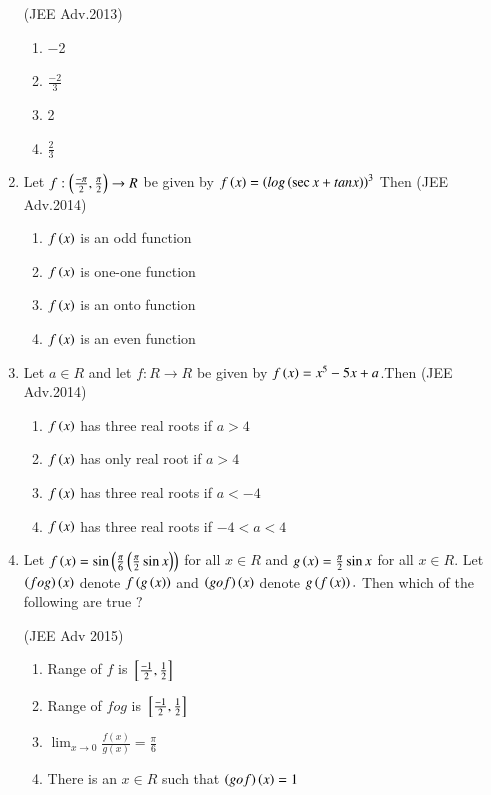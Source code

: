 \documentclass[journal,12pt,twocolumn]{IEEEtran}
\theoremstyle{remark}
\begin{document}
\begin{enumerate}[start=2]
\hfill(JEE Adv.2013)
\begin{multicols}{4}
\begin{enumerate} [label=(\alph*)]
\item $-$2
\item $\frac{-2}{3}$
\item 2
\item$\frac{2}{3}$
\end{enumerate}
\end{multicols}
\item Let $f:\left(\frac{-\pi}{2},\frac{\pi}{2}\right)\rightarrow{R}$ be given by $f\left(x\right)=\left(log\left(\sec{x}+tan{x}\right)\right)^3$ Then
\hfill(JEE Adv.2014)
\begin{enumerate} [label=(\alph*)]
\item$f\left(x\right)$ is an odd function
\item$f\left(x\right)$ is one-one function
\item$f\left(x\right)$ is an onto function
\item$f\left(x\right)$ is an even function
\end{enumerate}
\item Let $a \in R$ and let $f:R\rightarrow{R}$ be given by $f\left(x\right)=x^5-5x+a$.Then
\hfill(JEE Adv.2014)
\begin{enumerate} [label=(\alph*)]
\item $f\left(x\right)$ has three real roots if $a>4$
\item $f\left(x\right)$ has only real root if $a>4$
\item $f\left(x\right)$ has three real roots if $a<-4$
\item $f\left(x\right)$ has three real roots if $-4<a<4$
\end{enumerate}
\item Let $f\left(x\right)=\sin\left(\frac{\pi}{6}\left(\frac{\pi}{2}\sin{x}\right)\right)$ for all $x \in R $ and $g\left(x\right)=\frac{\pi}{2}\sin{x}$ for all $x \in R$. Let $\left(fog\right)\left(x\right)$ denote $f\left(g\left(x\right)\right)$ and $\left(gof\right)\left(x\right)$ denote $g\left(f\left(x\right)\right).$ Then which of the following are true $?$

\hfill(JEE Adv 2015)
\begin{enumerate} [label=(\alph*)]
\item Range of $f$ is ${}\left[\frac{-1}{2},\frac{1}{2}\right]$
\item Range of $fog$ is ${}\left[\frac{-1}{2},\frac{1}{2}\right]$
\item $\lim_{x\rightarrow{0}}\frac{f(x)}{g(x)}=\frac{\pi}{6}$
\item There is an $x \in R$ such that $\left(gof\right)\left(x\right)=1$
\end{enumerate}
\end{enumerate}
\end{document}
